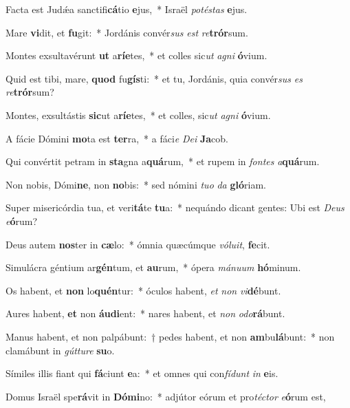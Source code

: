 \item Facta est Judǽa sanctifi\textbf{cá}tio \textbf{e}jus,~* Israël \textit{pot}\textit{és}\textit{tas} \textbf{e}jus.
\item Mare \textbf{vi}dit, et \textbf{fu}git:~* Jordánis convér\textit{sus} \textit{est} \textit{re}\textbf{trór}sum.
\item Montes exsultavérunt \textbf{ut} a\textbf{rí}\textbf{e}tes,~* et colles sic\textit{ut} \textit{a}\textit{gni} \textbf{ó}vium.
\item Quid est tibi, mare, \textbf{quod} fu\textbf{gís}ti:~* et tu, Jordánis, quia convér\textit{sus} \textit{es} \textit{re}\textbf{trór}sum?
\item Montes, exsultástis \textbf{sic}ut a\textbf{rí}\textbf{e}tes,~* et colles, sic\textit{ut} \textit{a}\textit{gni} \textbf{ó}vium.
\item A fácie Dómini \textbf{mo}ta est \textbf{ter}ra,~* a fáci\textit{e} \textit{De}\textit{i} \textbf{Ja}cob.
\item Qui convértit petram in \textbf{sta}gna a\textbf{quá}rum,~* et rupem in \textit{fon}\textit{tes} \textit{a}\textbf{quá}rum.
\item Non nobis, Dómi\textbf{ne}, non \textbf{no}bis:~* sed nómini \textit{tu}\textit{o} \textit{da} \textbf{gló}riam.
\item Super misericórdia tua, et veri\textbf{tá}te \textbf{tu}a:~* nequándo dicant gentes: Ubi est \textit{De}\textit{us} \textit{e}\textbf{ó}rum?
\item Deus autem \textbf{nos}ter in \textbf{cæ}lo:~* ómnia quæcúmque \textit{vó}\textit{lu}\textit{it}, \textbf{fe}cit.
\item Simulácra géntium ar\textbf{gén}tum, et \textbf{au}rum,~* ópera \textit{má}\textit{nu}\textit{um} \textbf{hó}minum.
\item Os habent, et \textbf{non} lo\textbf{quén}tur:~* óculos habent, \textit{et} \textit{non} \textit{vi}\textbf{dé}bunt.
\item Aures habent, \textbf{et} non \textbf{áu}\textbf{di}ent:~* nares habent, et \textit{non} \textit{o}\textit{do}\textbf{rá}bunt.
\item Manus habent, et non palpábunt:~† pedes habent, et non \textbf{am}bu\textbf{lá}bunt:~* non clamábunt in \textit{gút}\textit{tu}\textit{re} \textbf{su}o.
\item Símiles illis fiant qui \textbf{fá}ciunt \textbf{e}a:~* et omnes qui con\textit{fí}\textit{dunt} \textit{in} \textbf{e}is.
\item Domus Israël spe\textbf{rá}vit in \textbf{Dó}\textbf{mi}no:~* adjútor eórum et pro\textit{téc}\textit{tor} \textit{e}\textbf{ó}rum est,
